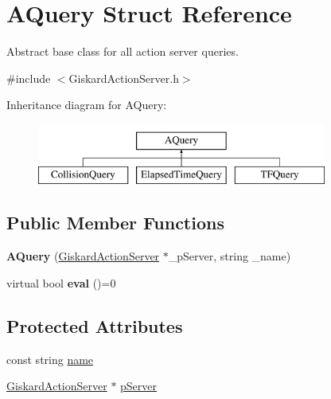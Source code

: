 \hypertarget{structAQuery}{\section{A\-Query Struct Reference}
\label{structAQuery}
}


Abstract base class for all action server queries.  




{\ttfamily \#include $<$Giskard\-Action\-Server.\-h$>$}

Inheritance diagram for A\-Query\-:\begin{figure}[H]
\begin{center}
\leavevmode
\includegraphics[height=2.000000cm]{structAQuery}
\end{center}
\end{figure}
\subsection*{Public Member Functions}
\begin{DoxyCompactItemize}
\item 
\hypertarget{structAQuery_a69ab1ecccf6747c152b6a82ad455eee7}{{\bfseries A\-Query} (\hyperlink{classGiskardActionServer}{Giskard\-Action\-Server} $\ast$\-\_\-p\-Server, string \-\_\-name)}\label{structAQuery_a69ab1ecccf6747c152b6a82ad455eee7}

\item 
\hypertarget{structAQuery_a11e6e2e3528ddaeac181b3ed323b07e1}{virtual bool {\bfseries eval} ()=0}\label{structAQuery_a11e6e2e3528ddaeac181b3ed323b07e1}

\end{DoxyCompactItemize}
\subsection*{Protected Attributes}
\begin{DoxyCompactItemize}
\item 
const string \hyperlink{structAQuery_a209eec59fbdf038ec7de39db059ddaa4}{name}
\item 
\hyperlink{classGiskardActionServer}{Giskard\-Action\-Server} $\ast$ \hyperlink{structAQuery_ae8c350ae2bc8715fb1e1eec2ff099269}{p\-Server}
\end{DoxyCompactItemize}


